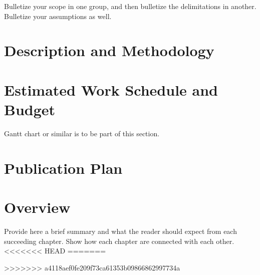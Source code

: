 Bulletize your scope in one group, and then bulletize the delimitations in another.  Bulletize your assumptions as well.


\section{Description and Methodology}

\blindtext


\ifFinished
\else

\section{Estimated Work Schedule and Budget}

Gantt chart or similar is to be part of this section.

\blindtext

\section{Publication Plan}
\blindtext

\fi


\section{Overview}

Provide here a brief summary and what the reader should expect from each succeeding chapter.  Show how each chapter are connected with each other.
<<<<<<< HEAD
=======

>>>>>>> a4118aef0fe209f73ca61353b09866862997734a
